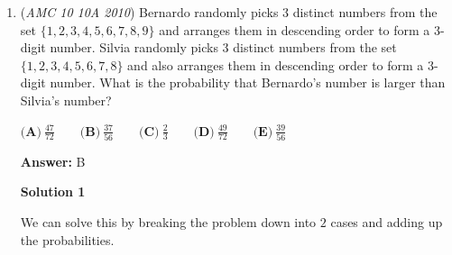 \begin{enumerate}
\textbf{Solution 3}

We can use \href{https://artofproblemsolving.com/wiki/index.php?title=Principle\_of\_Inclusion-Exclusion}{Principle of Inclusion-Exclusion} (PIE) to find the final volume of the cube.

 There are 3 "cuts" through the cube that go from one end to the other. Each of these "cuts" has $2 \times 2 \times 3=12$ cubic inches. However, we can not just sum their volumes, asthe central $2\times 2\times 2$ cube is included in each of these three cuts. To get the correct result, we can take the sum of the volumes of the three cuts, and subtract the volume of the central cube twice.

 Hence the total volume of the cuts is $3(2 \times 2 \times 3) - 2(2\times 2\times 2) = 36 - 16 = 20$.

 Therefore the volume of the rest of the cube is $3^3 - 20 = 27 - 20 = \boxed{7\ \textbf{(A)}}$.

 



\textbf{Solution 4}

We can visualize the final figure and see a cubic frame. We can find the volume of the figure by adding up the volumes of the edges and corners.

 Each edge can be seen as a $2\times 0.5\times 0.5$ box, and each corner can be seen as a $0.5\times 0.5\times 0.5$ box.

 $12\cdot{\frac{1}{2}} + 8\cdot{\frac{1}{8}} = 6+1 = \boxed{7\ \textbf{(A)}}$.

 


	\item (\textit{AMC 10 10A 2010}) Bernardo randomly picks 3 distinct numbers from the set $\{1,2,3,4,5,6,7,8,9\}$ and arranges them in descending order to form a 3-digit number. Silvia randomly picks 3 distinct numbers from the set $\{1,2,3,4,5,6,7,8\}$ and also arranges them in descending order to form a 3-digit number. What is the probability that Bernardo's number is larger than Silvia's number?


 $\textbf{(A)}\ \frac{47}{72} \qquad \textbf{(B)}\ \frac{37}{56} \qquad \textbf{(C)}\ \frac{2}{3} \qquad \textbf{(D)}\ \frac{49}{72} \qquad \textbf{(E)}\ \frac{39}{56}$

 \textbf{Answer: }B



\textbf{Solution 1}

We can solve this by breaking the problem down into $2$ cases and adding up the probabilities.


\end{enumerate}
